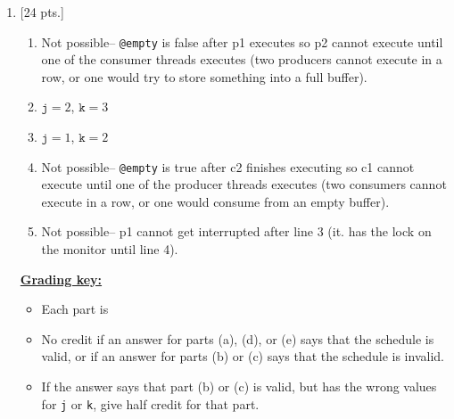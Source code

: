 \documentclass[11pt,fleqn]{article}
\begin{document}
\begin{enumerate}
    \item {[24 pts.]}

          \vspace{-2.5mm}

          \begin{enumerate}

            \addtolength{\itemsep}{4mm}

            \item Not possible-- \texttt{@empty} is false after p1 executes
                  so p2 cannot execute until one of the consumer threads
                  executes (two producers cannot execute in a row, or one
                  would try to store something into a full buffer).

            \item $\mathtt{j} = 2$, $\mathtt{k} = 3$

            \item $\mathtt{j} = 1$, $\mathtt{k} = 2$

            \item Not possible-- \texttt{@empty} is true after c2 finishes
                  executing so c1 cannot execute until one of the producer
                  threads executes (two consumers cannot execute in a row,
                  or one would consume from an empty buffer).

            \item Not possible-- p1 cannot get interrupted after line 3 (it.
                  has the lock on the monitor until line 4).

          \end{enumerate}

          \vspace{-2.5mm}

          \begin{info}{\textbf{\underline{Grading key:}}}

            \begin{itemize}

              \addtolength{\itemsep}{1mm}

              \item Each part is 

              \item No credit if an answer for parts (a), (d), or (e) says
                    that the schedule is valid, or if an answer for parts
                    (b) or (c) says that the schedule is invalid.

              \item If the answer says that part (b) or (c) is valid, but
                    has the wrong values for \texttt{j} or \texttt{k}, give
                    half credit for that part.


\end{itemize}
\end{info}
\end{enumerate}
\end{document}
